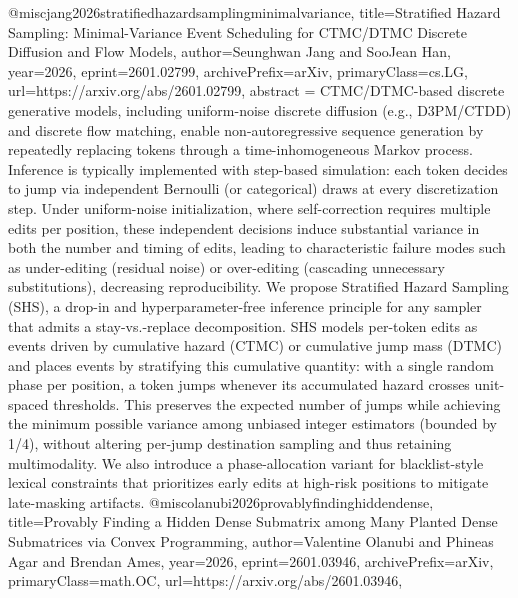 {}@misc{jang2026stratifiedhazardsamplingminimalvariance,
      title={Stratified Hazard Sampling: Minimal-Variance Event Scheduling for CTMC/DTMC Discrete Diffusion and Flow Models}, 
      author={Seunghwan Jang and SooJean Han},
      year={2026},
      eprint={2601.02799},
      archivePrefix={arXiv},
      primaryClass={cs.LG},
      url={https://arxiv.org/abs/2601.02799},
      abstract = {CTMC/DTMC-based discrete generative models, including uniform-noise discrete diffusion (e.g., D3PM/CTDD) and discrete flow matching, enable non-autoregressive sequence generation by repeatedly replacing tokens through a time-inhomogeneous Markov process. Inference is typically implemented with step-based simulation: each token decides to jump via independent Bernoulli (or categorical) draws at every discretization step. Under uniform-noise initialization, where self-correction requires multiple edits per position, these independent decisions induce substantial variance in both the number and timing of edits, leading to characteristic failure modes such as under-editing (residual noise) or over-editing (cascading unnecessary substitutions), decreasing reproducibility.   We propose Stratified Hazard Sampling (SHS), a drop-in and hyperparameter-free inference principle for any sampler that admits a stay-vs.-replace decomposition. SHS models per-token edits as events driven by cumulative hazard (CTMC) or cumulative jump mass (DTMC) and places events by stratifying this cumulative quantity: with a single random phase per position, a token jumps whenever its accumulated hazard crosses unit-spaced thresholds. This preserves the expected number of jumps while achieving the minimum possible variance among unbiased integer estimators (bounded by 1/4), without altering per-jump destination sampling and thus retaining multimodality. We also introduce a phase-allocation variant for blacklist-style lexical constraints that prioritizes early edits at high-risk positions to mitigate late-masking artifacts.}
}@misc{olanubi2026provablyfindinghiddendense,
      title={Provably Finding a Hidden Dense Submatrix among Many Planted Dense Submatrices via Convex Programming}, 
      author={Valentine Olanubi and Phineas Agar and Brendan Ames},
      year={2026},
      eprint={2601.03946},
      archivePrefix={arXiv},
      primaryClass={math.OC},
      url={https://arxiv.org/abs/2601.03946},
}

